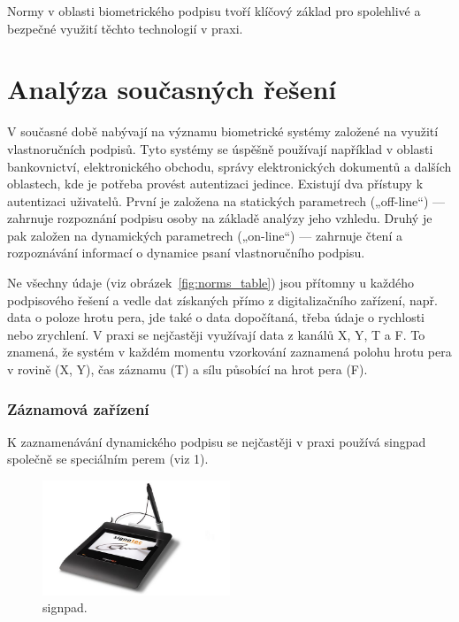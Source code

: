 Normy v oblasti biometrického podpisu tvoří klíčový základ pro spolehlivé a bezpečné využití těchto technologií v praxi.


\chapter{Analýza současných řešení}

V současné době nabývají na významu biometrické systémy založené na využití vlastnoručních podpisů. 
Tyto systémy se úspěšně používají například v oblasti bankovnictví, elektronického obchodu, správy elektronických dokumentů a dalších oblastech, kde je potřeba provést autentizaci jedince. 
Existují dva přístupy k autentizaci uživatelů.
První je založena na statických parametrech („off-line“) --- zahrnuje rozpoznání podpisu osoby na základě analýzy jeho vzhledu.
Druhý je pak založen na dynamických parametrech („on-line“) --- zahrnuje čtení a rozpoznávání informací o dynamice psaní vlastnoručního podpisu. %

Ne všechny údaje (viz obrázek~\ref{fig:norms_table}) jsou přítomny u každého podpisového řešení a vedle dat získaných přímo z digitalizačního zařízení, např. data o poloze hrotu pera, jde také o data dopočítaná, třeba údaje o rychlosti nebo zrychlení. %
V praxi se nejčastěji využívají data z kanálů X, Y, T a F. To znamená, že systém v každém momentu vzorkování zaznamená polohu hrotu pera v rovině (X, Y), čas záznamu (T) a sílu působící na hrot pera (F). %

\subsection*{Záznamová zařízení}
K zaznamenávání dynamického podpisu se nejčastěji v praxi používá singpad společně se speciálním perem (viz 1).

\begin{figure}[h]
  \centering
  \includegraphics[width=0.5\textwidth]{obrazky-figures/signpad.jpg}
  \caption{signpad.} %
  \label{fig:signpad}
\end{figure}

